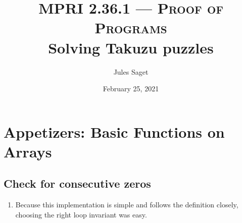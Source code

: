 \documentclass[a4paper]{article}
\title{{\normalsize \textsc{MPRI 2.36.1 --- Proof of Programs}}\\
  Solving Takuzu puzzles
}
\author{Jules Saget}
\date{February 25, 2021}
\begin{document}
\maketitle

\tableofcontents

\section{Appetizers: Basic Functions on Arrays}
\label{sec:appetizers}

\subsection{Check for consecutive zeros}

\begin{enumerate}
\item Because this implementation is simple and follows the definition closely,
  choosing the right loop invariant was easy.
\end{enumerate}

\newpage

\appendix

\end{document}
